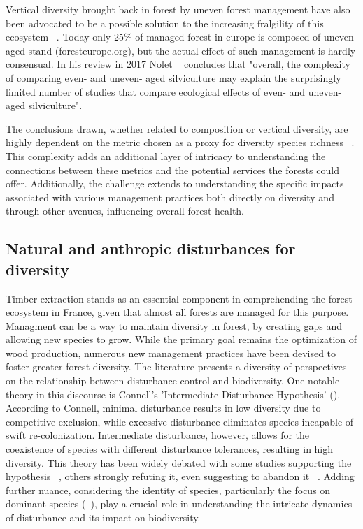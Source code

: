 \documentclass{article}
\begin{document}
Vertical diversity brought back in forest by uneven forest management have also been advocated to be a possible solution to the increasing fralgility of this ecosystem ~\autocite{guldinRoleUnevenAgedSilviculture1996}. Today only 25\% of managed forest in europe is composed of uneven aged stand (foresteurope.org), but the actual effect of such management is hardly consensual. In his review in 2017 Nolet ~\autocite{noletComparingEffectsEven2018} concludes that "overall, the complexity	of comparing even- and uneven- aged silviculture may explain the surprisingly limited number of studies that compare ecological effects of even- and uneven- aged silviculture".

The conclusions drawn, whether related to composition or vertical diversity, are highly dependent on the metric chosen as a proxy for diversity species richness ~\autocite{juckerClimateModulatesEffects2016, guldinRoleUnevenAgedSilviculture1996, noletComparingEffectsEven2018}. This complexity adds an additional layer of intricacy to understanding the connections between these metrics and the potential services the forests could offer. Additionally, the challenge extends to understanding the specific impacts associated with various management practices both directly on diversity and through other avenues, influencing overall forest health. \\

\subsection{Natural and anthropic disturbances for diversity}

Timber extraction stands as an essential component in comprehending the forest ecosystem in France, given that almost all forests are managed for this purpose. Managment can be a way to maintain diversity in forest, by creating gaps and allowing new species to grow. While the primary goal remains the optimization of wood production, numerous new management practices have been devised to foster greater forest diversity.
The literature presents a diversity of perspectives on the relationship between disturbance control and biodiversity. One notable theory in this discourse is Connell's 'Intermediate Disturbance Hypothesis' (\citeyear{connellDiversityTropicalRain1978}). According to Connell, minimal disturbance results in low diversity due to competitive exclusion, while excessive disturbance eliminates species incapable of swift re-colonization. Intermediate disturbance, however, allows for the coexistence of species with different disturbance tolerances, resulting in high diversity. This theory has been widely debated with some studies supporting the hypothesis ~\autocite{sheilDefiningDefendingConnell2013}, others strongly refuting it, even suggesting to abandon it ~\autocite{foxIntermediateDisturbanceHypothesis2013}.
Adding further nuance, considering the identity of species, particularly the focus on dominant species (~\autocite{chessonMechanismsMaintenanceSpecies2000,barabasChessonCoexistenceTheory2018,pichancourtGrowingBiodiverseCarbonrich2014}), play a crucial role in understanding the intricate dynamics of disturbance and its impact on biodiversity.
\end{document}
